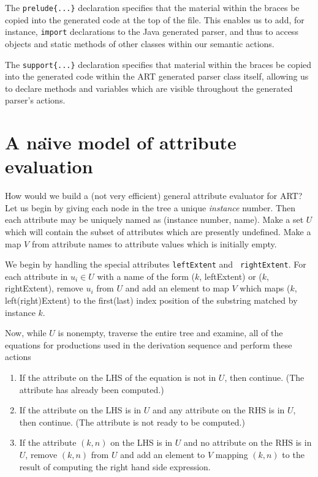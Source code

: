 The \verb+prelude{...}+ declaration specifies that the material within
the braces be copied into the generated code at the top of the
file. This enables us to add, for instance, {\tt import} declarations
to the Java generated parser, and thus to access objects and static
methods of other classes within our semantic actions.

The \verb+support{...}+ declaration specifies that material within the
braces be copied into the generated code within the ART generated parser
class itself, allowing us to declare methods and variables which are
visible throughout the generated parser's actions.

\section{A na\"\i ve model of attribute evaluation}
How would we build a (not very efficient) general attribute evaluator
for ART? Let us begin by giving each node in the tree a unique {\em
  instance} number. Then each attribute may be uniquely named as
(instance number, name). Make a set $U$ which will contain the subset
of attributes which are presently undefined. Make a map $V$ from
attribute names to attribute values which is initially empty.

We begin by handling the special attributes {\tt leftExtent} and {\tt
  rightExtent}. For each attribute in $u_i\in U$ with a name of the
form ($k$, leftExtent) or ($k$, rightExtent), remove $u_i$ from $U$
and add an element to map $V$ which maps ($k$, left(right)Extent) to
the first(last) index position of the substring matched by instance
$k$.

Now, while $U$ is nonempty, traverse the entire tree and examine, all of the equations for productions used in the derivation sequence and perform these actions
\begin{enumerate}
\item If the attribute on the LHS of the equation is not in $U$, then continue. (The attribute has already been computed.)
\item If the attribute on the LHS is in $U$ and any attribute on the RHS is in $U$, then continue. (The attribute is not ready to be computed.)
\item If the attribute $(k,n)$ on the LHS is in $U$ and no attribute on the
RHS is in $U$, remove $(k,n)$ from $U$ and add an element to $V$
mapping $(k, n)$ to the result of computing the right hand side
expression.
\end{enumerate}

